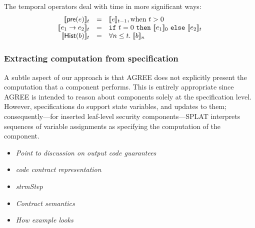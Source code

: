 The temporal operators deal with time in more significant ways:
\[
\begin{array}{rcl}
\sem{\konst{pre}(e)}_t & = & \sem{e}_{t-1}, \mathrm{when}\ t > 0 \\
\sem{e_1 \to e_2}_t & = & \itelse{t=0}{\sem{e_1}_0}{\sem{e_2}_t} \\
\sem{\konst{Hist}(b)}_t & = & \forall n \leq t.\; \sem{b}_n
\end{array}
\]

\subsubsection{Extracting computation from specification}

A subtle aspect of our approach is that AGREE does not explicitly
present the computation that a component performs. This is entirely
appropriate since AGREE is intended to reason about components solely
at the specification level. However, specifications do support state
variables, and updates to them; consequently---for inserted leaf-level
security components---SPLAT interprets sequences of variable
assignments as specifying the computation of the component.

\begin{itemize}
\item \textit{Point to discussion on output code guarantees}

\item \textit{code contract representation}

\item \textit{strmStep}

\item \textit{Contract semantics}

\item \textit{How example looks}
\end{itemize}

